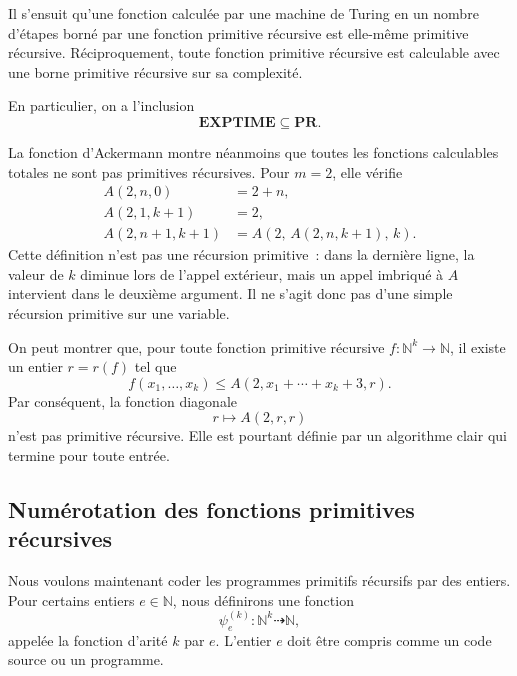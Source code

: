 Il s'ensuit qu'une fonction calculée par une machine de Turing en un
nombre d'étapes borné par une fonction primitive récursive est
elle-même primitive récursive.  Réciproquement, toute fonction
primitive récursive est calculable avec une borne primitive récursive
sur sa complexité.


En particulier, on a l'inclusion
\[
\mathbf{EXPTIME}\subseteq\mathbf{PR}.
\]

\thingy La fonction d'Ackermann montre néanmoins que toutes les
fonctions calculables totales ne sont pas primitives récursives.  Pour
$m=2$, elle vérifie
\[
\begin{aligned}
A(2,n,0)&=2+n,\\
A(2,1,k+1)&=2,\\
A(2,n+1,k+1)&=A(2,\,A(2,n,k+1),\,k).
\end{aligned}
\]
Cette définition n'est pas une récursion primitive : dans la dernière
ligne, la valeur de $k$ diminue lors de l'appel extérieur, mais un
appel imbriqué à $A$ intervient dans le deuxième argument.  Il ne
s'agit donc pas d'une simple récursion primitive sur une variable.

On peut montrer que, pour toute fonction primitive récursive
$f\colon\mathbb{N}^k\to\mathbb{N}$, il existe un entier $r=r(f)$ tel
que
\[
f(x_1,\ldots,x_k)
 \leq A(2,x_1+\cdots+x_k+3,r).
\]
Par conséquent, la fonction diagonale
\[
r\mapsto A(2,r,r)
\]
n'est pas primitive récursive.  Elle est pourtant définie par un
algorithme clair qui termine pour toute entrée.


\subsection{Numérotation des fonctions primitives récursives}
\label{subsection-numbering-primitive-recursive-functions}

\thingy Nous voulons maintenant coder les programmes primitifs
récursifs par des entiers.  Pour certains entiers $e\in\mathbb{N}$,
nous définirons une fonction
\[
\psi_e^{(k)}\colon\mathbb{N}^k\dasharrow\mathbb{N},
\]
appelée la fonction d'arité $k$  par $e$.  L'entier $e$ doit être compris comme un
code source ou un programme.

